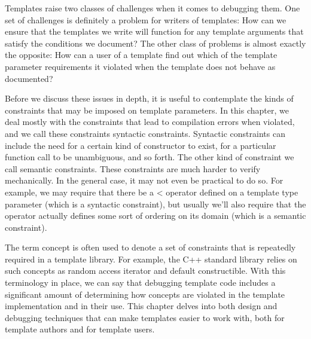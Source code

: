 Templates raise two classes of challenges when it comes to debugging them. One set of challenges is definitely a problem for writers of templates: How can we ensure that the templates we write will function for any template arguments that satisfy the conditions we document? The other class of problems is almost exactly the opposite: How can a user of a template find out which of the template parameter requirements it violated when the template does not behave as documented?

Before we discuss these issues in depth, it is useful to contemplate the kinds of constraints that may be imposed on template parameters. In this chapter, we deal mostly with the constraints that lead to compilation errors when violated, and we call these constraints syntactic constraints. Syntactic constraints can include the need for a certain kind of constructor to exist, for a particular function call to be unambiguous, and so forth. The other kind of constraint we call semantic constraints. These constraints are much harder to verify mechanically. In the general case, it may not even be practical to do so. For example, we may require that there be a < operator defined on a template type parameter (which is a syntactic constraint), but usually we’ll also require that the operator actually defines some sort of ordering on its domain (which is a semantic constraint).

The term concept is often used to denote a set of constraints that is repeatedly required in a template library. For example, the C++ standard library relies on such concepts as random access iterator and default constructible. With this terminology in place, we can say that debugging template code includes a significant amount of determining how concepts are violated in the template implementation and in their use. This chapter delves into both design and debugging techniques that can make templates easier to work with, both for template authors and for template users.
